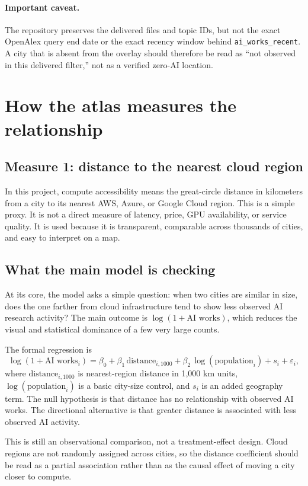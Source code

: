 \documentclass[11pt]{article}
\begin{document}
\paragraph{Important caveat.}
The repository preserves the delivered files and topic IDs, but not the exact OpenAlex query end date or the exact recency window behind \texttt{ai\_works\_recent}. A city that is absent from the overlay should therefore be read as ``not observed in this delivered filter,'' not as a verified zero-AI location.

\section{How the atlas measures the relationship}
\subsection{Measure 1: distance to the nearest cloud region}
In this project, compute accessibility means the great-circle distance in kilometers from a city to its nearest AWS, Azure, or Google Cloud region. This is a simple proxy. It is not a direct measure of latency, price, GPU availability, or service quality. It is used because it is transparent, comparable across thousands of cities, and easy to interpret on a map.

\subsection{What the main model is checking}
At its core, the model asks a simple question: when two cities are similar in size, does the one farther from cloud infrastructure tend to show less observed AI research activity? The main outcome is \(\log(1 + \text{AI works})\), which reduces the visual and statistical dominance of a few very large counts.

The formal regression is
\[
\log(1 + \text{AI works}_i) = \beta_0 + \beta_1 \,\text{distance}_{i,1000} + \beta_2 \,\log(\text{population}_i) + s_i + \varepsilon_i,
\]
where \(\text{distance}_{i,1000}\) is nearest-region distance in 1,000 km units, \(\log(\text{population}_i)\) is a basic city-size control, and \(s_i\) is an added geography term. The null hypothesis is that distance has no relationship with observed AI works. The directional alternative is that greater distance is associated with less observed AI activity.

This is still an observational comparison, not a treatment-effect design. Cloud regions are not randomly assigned across cities, so the distance coefficient should be read as a partial association rather than as the causal effect of moving a city closer to compute.
\end{document}
